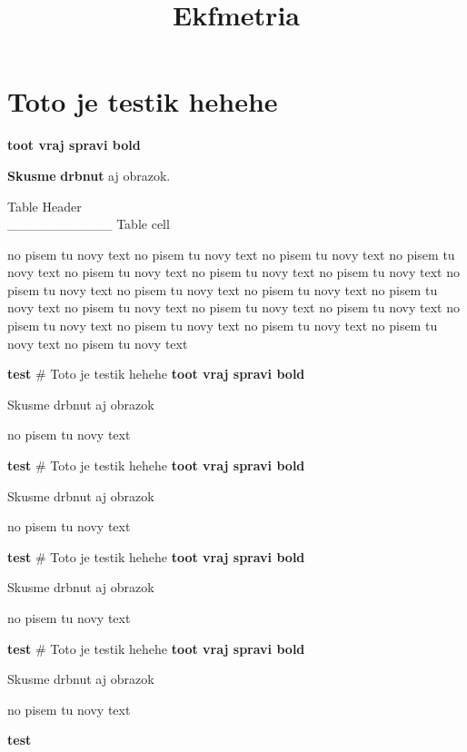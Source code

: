 \documentclass[
]{article}
\title{Ekfmetria}
\author{}
\date{\vspace{-2.5em}}
\begin{document}
\maketitle

\hypertarget{toto-je-testik-hehehe}{%
\section{Toto je testik hehehe}\label{toto-je-testik-hehehe}}

\textbf{toot vraj spravi bold}

\textbf{Skusme} \textbf{drbnut} aj obrazok.

Table Header\\
\_\_\_\_\_\_\_\_\_\_\_ Table cell

no pisem tu novy text no pisem tu novy text no pisem tu novy text no
pisem tu novy text no pisem tu novy text no pisem tu novy text no pisem
tu novy text no pisem tu novy text no pisem tu novy text no pisem tu
novy text no pisem tu novy text no pisem tu novy text no pisem tu novy
text no pisem tu novy text no pisem tu novy text no pisem tu novy text
no pisem tu novy text no pisem tu novy text no pisem tu novy text

\textbf{test} \# Toto je testik hehehe \textbf{toot vraj spravi bold}

Skusme drbnut aj obrazok

no pisem tu novy text

\textbf{test} \# Toto je testik hehehe \textbf{toot vraj spravi bold}

Skusme drbnut aj obrazok

no pisem tu novy text

\textbf{test} \# Toto je testik hehehe \textbf{toot vraj spravi bold}

Skusme drbnut aj obrazok

no pisem tu novy text

\textbf{test} \# Toto je testik hehehe \textbf{toot vraj spravi bold}

Skusme drbnut aj obrazok

no pisem tu novy text

\textbf{test}
\end{document}
